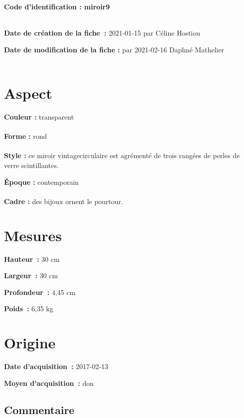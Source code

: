  
    
    
    {\bf \huge Code d’identification : miroir9}
    \\ \\ \hr
    \begin{center}
    \end{center}
    
    {\bf \large Date de création de la fiche :} 2021-01-15
    {par Céline Hostiou}
  
    {\bf \large Date de modification de la fiche :} 
    {par 2021-02-16}
    Daphné Mathelier \\ \\ \hr
    \section* {Aspect}
   {\bf \large Couleur :} transparent
    \\ \\ {\bf \large Forme :}  rond
    \\ \\ {\bf \large Style :} ce miroir vintagecirculaire est agrémenté de trois rangées de perles de verre scintillantes.
        
        {\bf \large Époque :} contemporain
    \\ \\ {\bf \large Cadre :} des bijoux ornent le pourtour.
        
    \section* {Mesures}
      
  {\bf \large Hauteur :} 30 cm
   
   {\bf \large Largeur :} 30 cm
    
   {\bf \large Profondeur :} 4,45 cm
    
   {\bf \large Poids :} 6,35 kg
     
    \section* {Origine}
    {\bf \large Date d’acquisition :} 2017-02-13

    {\bf \large Moyen d’acquisition :} don
      \subsection* {Commentaire}
       
